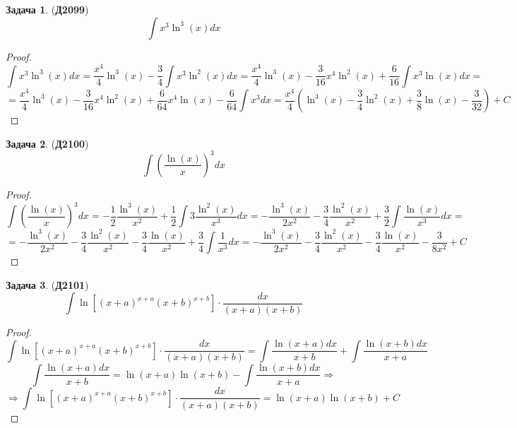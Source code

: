 \documentclass[12pt]{article}
\theoremstyle{definition}
\newtheorem{problem}{Задача}
\DeclareMathOperator{\dint}{\displaystyle\int}
\begin{document}
\begin{problem}(\textbf{Д2099})
	$$
		\dint x^3\ln^3(x)dx 
	$$
\end{problem}
\begin{proof}
	$$
		\dint x^3\ln^3(x)dx = \dfrac{x^4}{4}\ln^3(x) - \dfrac{3}{4}\dint x^3 \ln^2(x) dx = \dfrac{x^4}{4}\ln^3(x) - \dfrac{3}{16}x^4\ln^2(x) + \dfrac{6}{16}\dint x^3 \ln(x) dx =
	$$
	$$
		= \dfrac{x^4}{4}\ln^3(x) - \dfrac{3}{16}x^4\ln^2(x) + \dfrac{6}{64}x^4\ln(x) - \dfrac{6}{64}\dint x^3dx = \dfrac{x^4}{4}\left(\ln^3(x) - \dfrac{3}{4}\ln^2(x) + \dfrac{3}{8}\ln(x) -\dfrac{3}{32}\right) + C
	$$
\end{proof}
\begin{problem}(\textbf{Д2100})
	$$
		\dint \left(\dfrac{\ln(x)}{x}\right)^3dx
	$$
\end{problem}
\begin{proof}
	$$
		\dint \left(\dfrac{\ln(x)}{x}\right)^3dx = -\dfrac{1}{2}\dfrac{\ln^3(x)}{x^2} + \dfrac{1}{2}\dint 3\dfrac{\ln^2(x)}{x^3}dx = -\dfrac{\ln^3(x)}{2x^2} - \dfrac{3}{4}\dfrac{\ln^2(x)}{x^2} + \dfrac{3}{2}\dint \dfrac{\ln(x)}{x^3}dx =
	$$
	$$
		= -\dfrac{\ln^3(x)}{2x^2} - \dfrac{3}{4}\dfrac{\ln^2(x)}{x^2}- \dfrac{3}{4}\dfrac{\ln(x)}{x^2} + \dfrac{3}{4}\dint\dfrac{1}{x^3}dx= -\dfrac{\ln^3(x)}{2x^2} - \dfrac{3}{4}\dfrac{\ln^2(x)}{x^2}- \dfrac{3}{4}\dfrac{\ln(x)}{x^2} - \dfrac{3}{8x^2} + C
 	$$
\end{proof}

\begin{problem}(\textbf{Д2101})
	$$
		\dint \ln\left[(x+a)^{x + a}(x + b)^{x + b}\right]{\cdot}\dfrac{dx}{(x+a)(x+b)}
	$$
\end{problem}
\begin{proof}
	$$
		\dint \ln\left[(x+a)^{x + a}(x + b)^{x + b}\right]{\cdot}\dfrac{dx}{(x+a)(x+b)} = \dint \dfrac{\ln(x+a)dx}{x + b} + \dint \dfrac{\ln(x+b)dx}{x + a}
	$$
	$$
		\dint \dfrac{\ln(x+a)dx}{x + b} = \ln(x+a)\ln(x+ b) - \dint\dfrac{\ln(x+b)dx}{x + a} \Rightarrow
	$$
	$$
		\Rightarrow \dint \ln\left[(x+a)^{x + a}(x + b)^{x + b}\right]{\cdot}\dfrac{dx}{(x+a)(x+b)} = \ln(x+a)\ln(x+b) + C
	$$
\end{proof}
\end{document}

